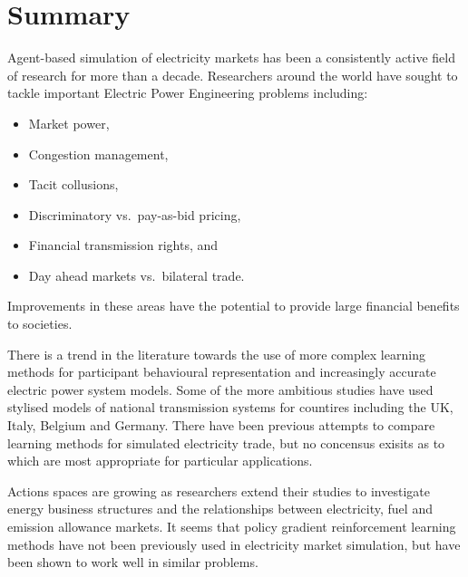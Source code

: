 
\section{Summary}
Agent-based simulation of electricity markets has been a consistently active
field of research for more than a decade.  Researchers around the world have
sought to tackle important Electric Power Engineering problems including:
\begin{itemize}
  \item Market power,
  \item Congestion management,
  \item Tacit collusions,
  \item Discriminatory vs.~pay-as-bid pricing,
  \item Financial transmission rights, and
  \item Day ahead markets vs.~bilateral trade.
\end{itemize}
Improvements in these areas have the potential to provide large financial
benefits to societies.

There is a trend in the literature towards the use of more complex learning
methods for participant behavioural representation and increasingly accurate
electric power system models.  Some of the more ambitious studies have used
stylised models of national transmission systems for countires including the
UK, Italy, Belgium and Germany.  There have been previous attempts to compare
learning methods for simulated electricity trade, but no concensus exisits as
to which are most appropriate for particular applications.

Actions spaces are growing as researchers extend their studies to investigate
energy business structures and the relationships between electricity, fuel and
emission allowance markets.  It seems that policy gradient reinforcement
learning methods have not been previously used in electricity market
simulation, but have been shown to work well in similar problems.
